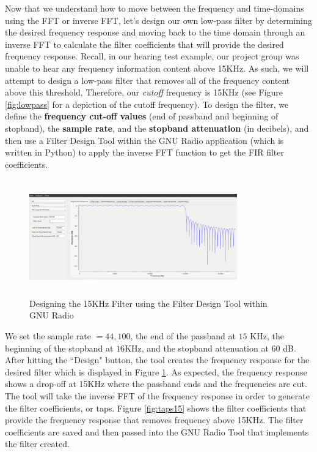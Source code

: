Now that we understand how to move between the frequency and time-domains using the FFT or inverse FFT, let's design our own low-pass filter by determining the desired frequency response and moving back to the time domain through an inverse FFT to calculate the filter coefficients that will provide the desired frequency response.  Recall, in our hearing test example, our project group was unable to hear any frequency information content above 15KHz.  As such, we will attempt to design a low-pass filter that removes all of the frequency content above this threshold.  Therefore, our \textit{cutoff} frequency is 15KHz (see Figure \ref{fig:lowpass} for a depiction of the cutoff frequency).  To design the filter, we define the  \textbf{frequency cut-off values} (end of passband and beginning of stopband), the \textbf{sample rate}, and the \textbf{stopband attenuation} (in decibels), and then use a Filter Design Tool within the GNU Radio application (which is written in Python) to apply the inverse FFT function to get the FIR filter coefficients.  

\begin{figure}[h!]
	\centering
	\includegraphics[height = 5cm, width =9cm]{filter_tool_15kHz.png} %
	\caption{Designing the 15KHz Filter using the Filter Design Tool within GNU Radio}
	\label{fig:mainfilt}
\end{figure}  

We set the sample rate $= 44,100$, the end of the passband at  $15$ KHz, the beginning of the stopband at $16$KHz, and the stopband attenuation at $60$ dB.  After hitting the ``Design" button, the tool creates the frequency response for the desired filter which is displayed in Figure \ref{fig:mainfilt}.  As expected, the frequency response shows a drop-off at 15KHz where the passband ends and the frequencies are cut.  The tool will take the inverse FFT of the frequency response in order to generate the filter coefficients, or taps.  Figure \ref{fig:taps15} shows the filter coefficients that provide the frequency response that removes frequency above 15KHz.  The filter coefficients are saved and then passed into the GNU Radio Tool that implements the filter created.      

